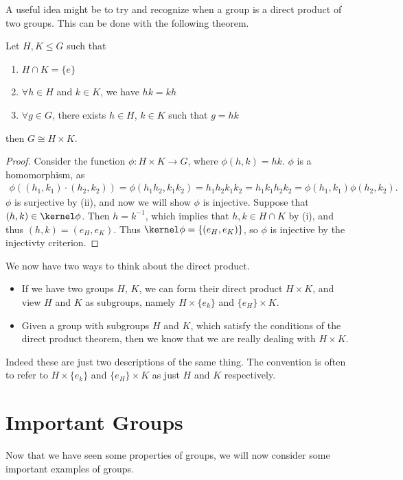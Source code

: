 \documentclass[a4paper]{scrartcl}
\newcommand{\newchapter}{\section}
\begin{document}
A useful idea might be to try and recognize when a group is a direct product of two groups. This can be done with the following theorem.

\begin{theorem}
	Let $H, K \leq G$ such that
	\begin{enumerate}[label=(\roman*)]
		\item $H \cap K = \{e\}$
		\item $\forall h \in H$ and $k \in K$, we have $hk = kh$
		\item $\forall g \in G$, there exists $h \in H$, $k \in K$ such that $g = hk$
	\end{enumerate}
	then $G \cong H \times K$.
\end{theorem}
% 
\begin{proof}
	Consider the function $\phi : H \times K \rightarrow G$, where $\phi(h, k) = hk$.
	$\phi$ is a homomorphism, as
	\begin{align*}
		\phi((h_1, k_1) \cdot (h_2, k_2)) = \phi(h_1 h_2, k_1 k_2) = h_1 h_2 k_1 k_2 = h_1 k_1 h_2 k_2 = \phi(h_1, k_1) \phi(h_2, k_2).
	\end{align*}
	$\phi$ is surjective by (ii), and now we will show $\phi$ is injective.
	Suppose that $(h, k) \in \kernel\phi$. Then $h = k^{-1}$, which implies that $h, k \in H \cap K$ by (i), and thus $(h, k) = (e_H, e_K)$. Thus $\kernel \phi = \{(e_H, e_K)\}$, so $\phi$ is injective by the injectivty criterion.
\end{proof}

We now have two ways to think about the direct product. 
\begin{itemize}
	\item If we have two groups $H$, $K$, we can form their direct product $H \times K$, and view $H$ and $K$ as subgroups, namely $H \times \{e_k\}$ and $\{e_H\} \times K$.
	\item Given a group with subgroups $H$ and $K$, which satisfy the conditions of the direct product theorem, then we know that we are really dealing with $H \times K$.
\end{itemize}
Indeed these are just two descriptions of the same thing. The convention is often to refer to $H \times \{e_k\}$ and $\{e_H\} \times K$ as just $H$ and $K$ respectively.

\newchapter{Important Groups}

Now that we have seen some properties of groups, we will now consider some important examples of groups.
\end{document}
